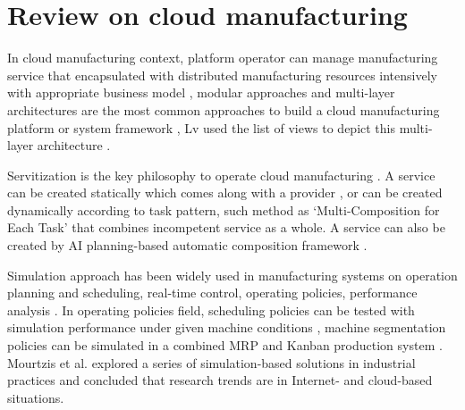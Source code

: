\section{Review on cloud manufacturing} %
\label{sec:literature_review}


In cloud manufacturing context, platform operator can manage  manufacturing service that encapsulated with distributed manufacturing resources intensively with appropriate business model \cite{Xu2012}, modular approaches and multi-layer architectures are the most common approaches to build a cloud manufacturing platform or system framework \cite{Tao2012,Valilai2013}, Lv used the list of views to depict this multi-layer architecture \cite{LvJuly312012-Aug.22012}.

Servitization is the key philosophy to operate cloud manufacturing \cite{li2010cloud}. A  service can be created statically which comes along with a provider \cite{Tao2012}, or can be created dynamically according to task pattern, such method as `Multi-Composition for Each Task' \cite{Liu2013} that combines incompetent service as a whole. A service can also be created by AI planning-based automatic composition framework \cite{OhJan.-March2008}.

Simulation approach has been widely used in manufacturing systems on operation planning and scheduling, real-time control, operating policies, performance analysis \cite{Smith2003}. In operating policies field, scheduling policies can be tested with simulation performance under given machine conditions \cite{Sabuncuoglu2003}, machine
segmentation policies can be simulated in a combined MRP and Kanban production system \cite{Felberbauer9-12Dec.2012}. Mourtzis et al. \cite{Mourtzis2015} explored a series of simulation-based solutions in industrial practices and concluded that research trends are in  Internet- and cloud-based situations.


